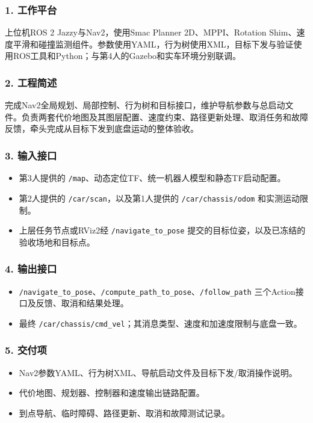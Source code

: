 \documentclass[UTF8,fontset=fandol,11pt,a4paper]{ctexart}
\begin{document}
\subsubsection*{1. 工作平台}
上位机ROS 2 Jazzy与Nav2，使用Smac Planner 2D、MPPI、Rotation Shim、速度平滑和碰撞监测组件。参数使用YAML，行为树使用XML，目标下发与验证使用ROS工具和Python；与第4人的Gazebo和实车环境分别联调。

\subsubsection*{2. 工程简述}
完成Nav2全局规划、局部控制、行为树和目标接口，维护导航参数与总启动文件。负责两套代价地图及其图层配置、速度约束、路径更新处理、取消任务和故障反馈，牵头完成从目标下发到底盘运动的整体验收。

\subsubsection*{3. 输入接口}
\begin{itemize}
\item 第3人提供的 \nolinkurl{/map}、动态定位TF、统一机器人模型和静态TF启动配置。
\item 第2人提供的 \nolinkurl{/car/scan}，以及第1人提供的 \nolinkurl{/car/chassis/odom} 和实测运动限制。
\item 上层任务节点或RViz2经 \nolinkurl{/navigate_to_pose} 提交的目标位姿，以及已冻结的验收场地和目标点。
\end{itemize}

\subsubsection*{4. 输出接口}
\begin{itemize}
\item \nolinkurl{/navigate_to_pose}、\nolinkurl{/compute_path_to_pose}、\nolinkurl{/follow_path} 三个Action接口及反馈、取消和结果处理。
\item 最终 \nolinkurl{/car/chassis/cmd_vel}；其消息类型、速度和加速度限制与底盘一致。
\end{itemize}

\subsubsection*{5. 交付项}
\begin{itemize}
\item Nav2参数YAML、行为树XML、导航启动文件及目标下发/取消操作说明。
\item 代价地图、规划器、控制器和速度输出链路配置。
\item 到点导航、临时障碍、路径更新、取消和故障测试记录。
\end{itemize}
\end{document}

